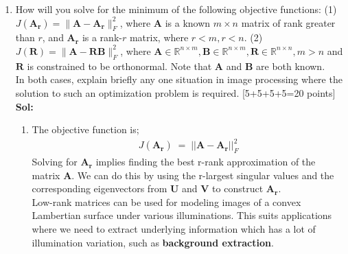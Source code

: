 \documentclass[11pt]{article}
\begin{document}
\begin{enumerate}
\clearpage
\item How will you solve for the minimum of the following objective functions: (1) $J(\boldsymbol{A_r}) = \|\boldsymbol{A}-\boldsymbol{A_r}\|^2_F$, where $\boldsymbol{A}$ is a known $m \times n$ matrix of rank greater than $r$, and $\boldsymbol{A_r}$ is a rank-$r$ matrix, where $r < m, r < n$. (2) $J(\boldsymbol{R}) = \|\boldsymbol{A}-\boldsymbol{R} \boldsymbol{B}\|^2_F$, where $\boldsymbol{A} \in \mathbb{R}^{n \times m}, \boldsymbol{B} \in \mathbb{R}^{n \times m}, \boldsymbol{R} \in \mathbb{R}^{n \times n}, m > n$ and $\boldsymbol{R}$ is constrained to be orthonormal. Note that $\boldsymbol{A}$ and $\boldsymbol{B}$ are both known. \\
In both cases, explain briefly any one situation in image processing where the solution to such an optimization problem is required. \textsf{[5+5+5+5=20 points]}\\
\textbf{Sol:}\\
\begin{enumerate}
    \item The objective function is;
    \begin{gather}
        J(\mathbf{A_r})\;=\;||\mathbf{A}-\mathbf{A_r}||^2_F
    \end{gather}
    Solving for $\mathbf{A_r}$ implies finding the best r-rank approximation of the matrix $\mathbf{A}$. We can do this by using the r-largest singular values and the corresponding eigenvectors from $\mathbf{U}$ and $\mathbf{V}$ to construct $\mathbf{A_r}$.\\
    Low-rank matrices can be used for modeling images of a convex Lambertian surface under various illuminations. This suits applications where we need to extract underlying information which has a lot of illumination variation, such as \textbf{background extraction}.
    

\end{enumerate}
\end{enumerate}
\end{document}
